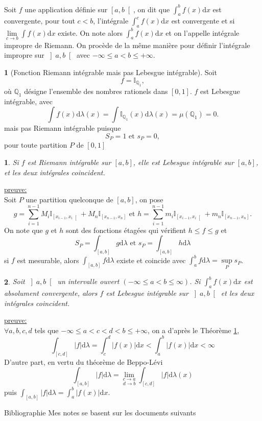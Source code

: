 \documentclass[8pt,notheorems]{beamer}
\newtheorem{theorem}{\translate{Theorem}}[section]
\newtheorem{theorem}{\translate{Theoreme}}
\theoremstyle{definition}
\theoremstyle{example}
\newtheorem{remark}{\translate{Remarque}}
\theoremstyle{mystyle}
\theoremstyle{plain}
\begin{document}
\begin{frame}[allowframebreaks]
Soit $f$ une application définie sur $\left[a,b\right[$, on dit que $\int_{a}^bf(x)\text{d}x$ est convergente, pour tout $c<b$, l'intégrale $\int_{a}^c f(x)\text{d}x$ est convergente et si $\underset{c\rightarrow b}{\lim}\int f(x)\text{d}x$ existe. On note alors $\int_{a}^bf(x)\text{d}x$ et on l'appelle intégrale impropre de Riemann. On procède de la même manière pour définir l'intégrale impropre sur $\left]a,b\right[$ avec $-\infty\leq a<b\leq +\infty$.
\begin{remark}[Fonction Riemann intégrable mais pas Lebesgue intégrable]
Soit 
$$
f = \mathbb{I}_{\mathbb{Q}_1},
$$
où $\mathbb{Q}_1$ désigne l'ensemble des nombres rationels dans $[0,1]$. $f$ est Lebesgue intégrable, avec 
$$
\int f(x) \text{d}\lambda(x) = \int \mathbb{I}_{\mathbb{Q}_1}(x)\text{d}\lambda(x) = \mu(\mathbb{Q}_1) = 0.
$$
mais pas Riemann intégrable puisque 
$$S_P = 1\text{ et } s_P = 0,$$
pour toute partition $P$ de $[0,1]$
\end{remark}
\begin{theorem}\label{theo:Riemann-Lebesgue1}
Si $f$ est Riemann intégrable sur $[a,b]$, elle est Lebesgue intégrable sur $[a,b]$, et les deux intégrales coincident. 
\end{theorem}
\underline{preuve:}\\
Soit $P$ une partition quelconque de $[a,b]$, on pose 
$$
g = \sum_{i = 1}^{n-1}M_i\mathbb{I}_{\left[x_{i-1}, x_i\right[}+ M_n\mathbb{I}_{\left[x_{n-1}, x_n\right]}\text{ et }h = \sum_{i = 1}^{n-1}m_i\mathbb{I}_{\left[x_{i-1}, x_i\right[}+ m_n\mathbb{I}_{\left[x_{n-1}, x_n\right]}.
$$
On note que $g$ et $h$ sont des fonctions étagées qui vérifient $h\leq f\leq g$ et 
$$
S_P = \int_{[a,b]} g\text{d}\lambda\text{ et }s_P = \int_{[a,b]} h\text{d}\lambda
$$
si $f$ est mesurable, alors $\int_{[a,b]} f\text{d}\lambda$ existe et coincide avec $\int_a^b f\text{d}\lambda = \underset{P}{\sup} s_P$. 
\begin{theorem}
Soit $\left]a,b\right[$ un intervalle ouvert $(-\infty\leq a<b\leq\infty)$. Si $\int_a^bf(x)\text{d}x$ est absolument convergente, alors $f$ est Lebesgue intégrable sur $\left]a,b\right[$ et les deux intégrales coincident. 
\end{theorem}
\underline{preuve:}\\
$\forall a,b,c,d$ tels que $-\infty\leq a <c <d<b\leq +\infty$, on a d'après le Théorème \ref{theo:Riemann-Lebesgue1}, 
$$
\int_{[c,d]} |f|\text{d}\lambda  = \int_c^d|f(x)|\text{d}x <\int_a^b|f(x)|\text{d}x<\infty
$$
D'autre part, en vertu du théorème de Beppo-Lévi
$$
\int_{[a,b]} |f|\text{d}\lambda =\underset{d\rightarrow b}{\underset{c\rightarrow a}{\lim}}\int_{[c,d]} |f|\text{d}\lambda (x)
$$
puis $\int_{[a,b]} |f|\text{d}\lambda=\int_a^b |f(x)|\text{d}x$.

\end{frame}
\begin{frame}{Bibliographie}
Mes notes se basent sur les documents suivants \cite{Ca09,le2006integration,GaKu11}


 \end{frame}
\end{document}
